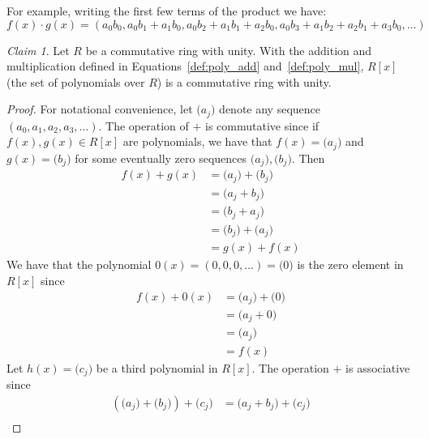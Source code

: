 \documentclass[12pt,letterpaper,DIV=11,final]{scrartcl}
\theoremstyle{plain}
\theoremstyle{definition}
\theoremstyle{remark}
\newtheorem{claim}{Claim}
\begin{document}
For example, writing the first few terms of the product we have:
\begin{displaymath}
  f(x) \cdot g(x) = (a_0 b_0, a_0 b_1 + a_1 b_0, a_0 b_2 + a_1 b_1 + a_2 b_0, a_0 b_3 + a_1 b_2 + a_2 b_1 + a_3 b_0, \dots)
\end{displaymath}

\begin{claim}\label{claim:commutativering_rx}
  Let $R$ be a commutative ring with unity.
  With the addition and multiplication defined in Equations~\ref{def:poly_add} and~\ref{def:poly_mul}, $R[x]$ (the set of polynomials over $R$) is a commutative ring with unity.

  \begin{proof}
    For notational convenience, let $\boldsymbol( a_j \boldsymbol)$ denote any sequence $(a_0, a_1, a_2, a_3, \dots)$.
    The operation of $+$ is commutative since if $f(x), g(x) \in R[x]$ are polynomials, we have that $f(x) = \boldsymbol( a_j \boldsymbol)$ and $g(x) = \boldsymbol( b_j \boldsymbol)$ for some eventually zero sequences $\boldsymbol( a_j \boldsymbol), \boldsymbol( b_j \boldsymbol)$.
    Then
    \begin{align*}
      f(x) + g(x) &= \boldsymbol( a_j \boldsymbol) + \boldsymbol( b_j \boldsymbol) \\
                  &= \boldsymbol( a_j + b_j \boldsymbol) \\
                  &= \boldsymbol( b_j + a_j \boldsymbol) \\
                  &= \boldsymbol( b_j \boldsymbol) + \boldsymbol( a_j \boldsymbol) \\
                  &= g(x) + f(x)
    \end{align*}
    We have that the polynomial $0(x) = (0, 0, 0, \dots) = \boldsymbol( 0 \boldsymbol)$ is the zero element in $R[x]$ since
    \begin{align*}
      f(x) + 0(x) &= \boldsymbol( a_j \boldsymbol) + \boldsymbol( 0 \boldsymbol) \\
                  &= \boldsymbol( a_j + 0 \boldsymbol) \\
                  &= \boldsymbol( a_j \boldsymbol) \\
                  &= f(x)
    \end{align*}
    Let $h(x) = \boldsymbol( c_j \boldsymbol)$ be a third polynomial in $R[x]$.
    The operation $+$ is associative since
    \begin{align*}
      \left( \boldsymbol( a_j \boldsymbol) + \boldsymbol( b_j \boldsymbol) \right) + \boldsymbol( c_j \boldsymbol) &= \boldsymbol( a_j + b_j \boldsymbol) + \boldsymbol( c_j \boldsymbol) \\

\end{align*}
\end{proof}
\end{claim}
\end{document}
